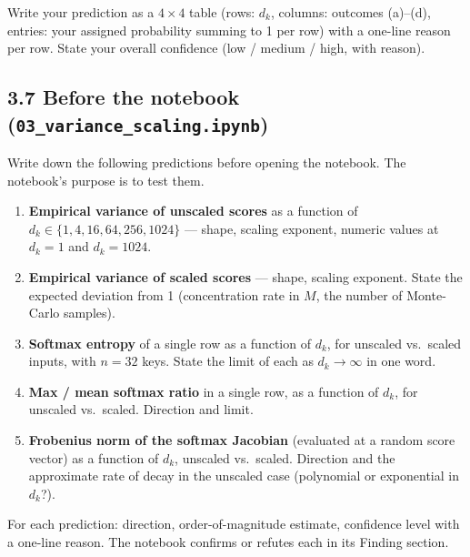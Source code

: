 \documentclass[
]{article}
\providecommand{\tightlist}{%
  \setlength{\itemsep}{0pt}\setlength{\parskip}{0pt}}
\begin{document}
Write your prediction as a \(4 \times 4\) table (rows: \(d_k\), columns:
outcomes (a)--(d), entries: your assigned probability summing to 1 per
row) with a one-line reason per row. State your overall confidence (low
/ medium / high, with reason).

\hypertarget{before-the-notebook-03_variance_scaling.ipynb}{%
\subsection{\texorpdfstring{3.7 Before the notebook
(\texttt{03\_variance\_scaling.ipynb})}{3.7 Before the notebook (03\_variance\_scaling.ipynb)}}\label{before-the-notebook-03_variance_scaling.ipynb}}

Write down the following predictions before opening the notebook. The
notebook's purpose is to test them.

\begin{enumerate}
\def\labelenumi{\arabic{enumi}.}
\tightlist
\item
  \textbf{Empirical variance of unscaled scores} as a function of
  \(d_k \in \{1, 4, 16, 64, 256, 1024\}\) --- shape, scaling exponent,
  numeric values at \(d_k = 1\) and \(d_k = 1024\).
\item
  \textbf{Empirical variance of scaled scores} --- shape, scaling
  exponent. State the expected deviation from 1 (concentration rate in
  \(M\), the number of Monte-Carlo samples).
\item
  \textbf{Softmax entropy} of a single row as a function of \(d_k\), for
  unscaled vs.~scaled inputs, with \(n = 32\) keys. State the limit of
  each as \(d_k \to \infty\) in one word.
\item
  \textbf{Max / mean softmax ratio} in a single row, as a function of
  \(d_k\), for unscaled vs.~scaled. Direction and limit.
\item
  \textbf{Frobenius norm of the softmax Jacobian} (evaluated at a random
  score vector) as a function of \(d_k\), unscaled vs.~scaled. Direction
  and the approximate rate of decay in the unscaled case (polynomial or
  exponential in \(d_k\)?).
\end{enumerate}

For each prediction: direction, order-of-magnitude estimate, confidence
level with a one-line reason. The notebook confirms or refutes each in
its Finding section.
\end{document}
